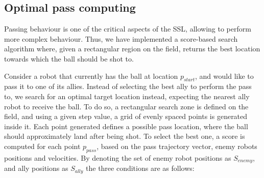 \subsection{Optimal pass computing}

Passing behaviour is one of the critical aspects of the SSL, allowing to perform
more complex behaviour. Thus, we have implemented a score-based search algorithm
where, given a rectangular region on the field, returns the best location towards
which the ball should be shot to.

Consider a robot that currently has the ball at location $p_{start}$, and would like to pass it to one
of its allies. Instead of selecting the best ally to perform the pass to,
we search for an optimal target location instead, expecting the nearest ally robot
to receive the ball. To do so, a rectangular search zone
is defined on the field, and using a given step value, a grid of evenly spaced points is generated inside it.
Each point generated defines a possible pass location, where the ball should approximately land after being shot.
To select the best one, a score is computed for each point $p_{pass}$,
based on the pass trajectory vector, enemy robots positions and velocities. By denoting the set of 
enemy robot positions as $S_{enemy}$, and ally positions as $S_{ally}$ the three conditions are as follows:

